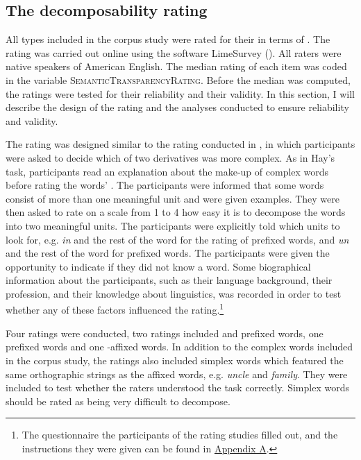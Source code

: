 






\subsection{The decomposability rating} \label{decomposability rating corpus}

All types included in the corpus study were rated for their  in terms of . The rating was carried out online using the software LimeSurvey (\citealt{LimeSurveyProjectTeam.2015}). All raters were native speakers of American English. The median rating of each item was coded in the variable  \textsc{SemanticTransparencyRating}. Before the median was computed, the ratings were tested for their reliability and their validity. In this section, I will describe the design of the rating and the analyses conducted to ensure reliability and validity. 

The rating was designed similar to the rating conducted in \cite{Hay.2001}, in which participants were asked to decide which of two derivatives was more complex. As in Hay's task,  participants read an explanation about the make-up of complex words before rating the words' .  The participants were informed that some words consist of more than one meaningful unit and were given examples. 
They were then asked to rate on a scale from 1 to 4 how easy it is to decompose the words into two meaningful units. The participants were explicitly told which units to look for, e.g.\textit{ in} and the rest of the word for the rating of prefixed words, and \textit{un} and the rest of the word for prefixed words. The participants were given the opportunity to  indicate if they did not know a word. 
Some biographical information about the participants, such as their language background, their profession, and their knowledge about linguistics, was recorded in order to test whether any of these factors influenced the rating.\footnote{The questionnaire the participants of the rating studies filled out, and the instructions they were given can be found in \hyperref[Appendix A: Decomposability Rating]{Appendix A}. } 

Four ratings were conducted, two ratings included  and prefixed words, one  prefixed words and one -affixed words. In addition to the complex words included in the corpus study, the ratings also included simplex words which featured the same orthographic strings as the affixed words, e.g. \textit{{un}cle} and \textit{fami{ly}}. They were included to test whether the raters understood the task correctly. Simplex words should be rated as being very difficult to decompose. 

